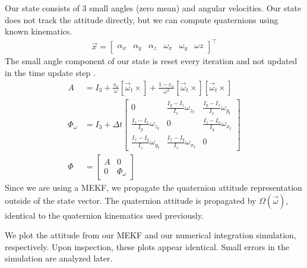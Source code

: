 Our state consists of 3 small angles (zero mean) and angular velocities. Our state does not track the attitude directly, but we can compute quaternions using known kinematics.
\begin{align*}
    \Vec{x} = \begin{bmatrix}
        \alpha_{x} & \alpha_{y} & \alpha_{z} & \omega_{x} & \omega_{y} & \omega{z}
    \end{bmatrix}^{\intercal}
\end{align*}
The small angle component of our state is reset every iteration and not updated in the time update step \cite{CubeSatTelescope}.
\begin{align*}
    A &= I_{3} + \frac{s_{\omega}}{\omega} [\Vec{\omega}_{t} \times] + \frac{1 - c_{\omega}}{\omega^{2}} [\Vec{\omega}_{t} \times] [\Vec{\omega}_{t} \times] \\
    \Phi_{\omega} & = I_{3} + \Delta t \begin{bmatrix}
        0 & \frac{I_{y} - I_{z}}{I_x} \omega_{z_{t}} & \frac{I_{y} - I_{z}}{I_x} \omega_{y_{t}} \\
        \frac{I_{z} - I_{x}}{I_y} \omega_{z_{t}} & 0 & \frac{I_{z} - I_{x}}{I_y} \omega_{x_{t}} \\
        \frac{I_{x} - I_{y}}{I_z} \omega_{y_{t}} & \frac{I_{x} - I_{y}}{I_z} \omega_{x_{t}} & 0
    \end{bmatrix} \\
    \Phi &= \begin{bmatrix}
        A & 0 \\
        0 & \Phi_{\omega}
    \end{bmatrix}
\end{align*}
Since we are using a MEKF, we propagate the quaternion attitude representation outside of the state vector. The quaternion attitude is propagated by $\Omega (\Vec{\omega})$, identical to the quaternion kinematics used previously.

We plot the attitude from our MEKF and our numerical integration simulation, respectively. Upon inspection, these plots appear identical. Small errors in the simulation are analyzed later.

